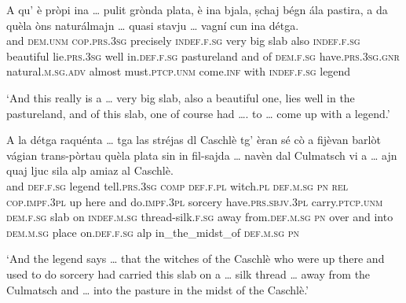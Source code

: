 \begin{linenumbers}
\gll    A qu’ è pròpi ina … pulit grònda plata, è ina bjala, ṣchaj bégn ála pastira, a da quèla òns naturálmajn … quasi stavju … vagní cun ina détga.\\
 and \textsc{dem.unm} \textsc{cop.prs.3sg} precisely \textsc{indef.f.sg} {} very big slab also \textsc{indef.f.sg} beautiful lie.\textsc{prs.3sg} well in.\textsc{def.f.sg} pastureland and of \textsc{dem.f.sg} have.\textsc{prs.3sg.gnr} natural.\textsc{m.sg.adv} {} almost must.\textsc{ptcp.unm} {} come.\textsc{inf} with \textsc{indef.f.sg} legend\\
\end{linenumbers}
\medskip
\glt `And this really is a … very big slab, also a beautiful one, lies well in the pastureland, and of this slab, one of course had …. to … come up with a legend.'
\medskip

\begin{linenumbers}
\gll    A la détga raquénta … tga las stréjas dl Caschlè tg’ èran sé cò a fijèvan barlòt vágian trans-pòrtau quèla plata sin\footnotemark{} in fil-sajda … navèn dal Culmatsch vi a … ajn quaj ljuc sila alp amiaz al Caschlè.\\
and \textsc{def.f.sg} legend tell.\textsc{prs.3sg} {} \textsc{comp} \textsc{def.f.pl} witch.\textsc{pl} \textsc{def.m.sg} \textsc{pn} \textsc{rel} \textsc{cop.impf.3pl} up here and do.\textsc{impf.3pl} sorcery have.\textsc{prs.sbjv.3pl} carry.\textsc{ptcp.unm} \textsc{dem.f.sg} slab on \textsc{indef.m.sg} thread-silk.\textsc{f.sg} {} away from.\textsc{def.m.sg} \textsc{pn} over and {} into \textsc{dem.m.sg} place on.\textsc{def.f.sg} alp in\_the\_midst\_of \textsc{def.m.sg} \textsc{pn}\\
\end{linenumbers}
\medskip
\glt `And the legend says … that the witches of the Caschlè who were up there and used to do sorcery had carried this slab on a … silk thread … away from the Culmatsch and … into the pasture in the midst of the Caschlè.'
\medskip

